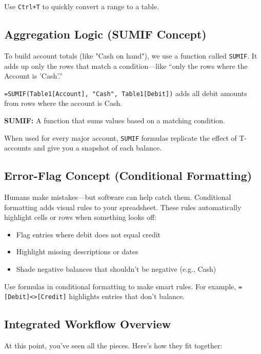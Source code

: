 \begin{Tip}
Use \texttt{Ctrl+T} to quickly convert a range to a table.
\end{Tip}

\subsection{Aggregation Logic (SUMIF Concept)}
To build account totals (like "Cash on hand"), we use a function called \texttt{SUMIF}. It adds up only the rows that match a condition—like “only the rows where the Account is 'Cash'.”

\begin{Example}
\verb|=SUMIF(Table1[Account], "Cash", Table1[Debit])| adds all debit amounts from rows where the account is Cash.
\end{Example}

\begin{Definition}
\textbf{SUMIF:} A function that sums values based on a matching condition.
\end{Definition}

When used for every major account, \texttt{SUMIF} formulas replicate the effect of T-accounts and give you a snapshot of each balance.

\subsection{Error-Flag Concept (Conditional Formatting)}
Humans make mistakes—but software can help catch them. Conditional formatting adds visual rules to your spreadsheet. These rules automatically highlight cells or rows when something looks off:

\begin{itemize}
\item Flag entries where debit does not equal credit
\item Highlight missing descriptions or dates
\item Shade negative balances that shouldn’t be negative (e.g., Cash)
\end{itemize}

\begin{Tip}
Use formulas in conditional formatting to make smart rules. For example, \verb|=[Debit]<>[Credit]| highlights entries that don’t balance.
\end{Tip}

\subsection{Integrated Workflow Overview}
At this point, you’ve seen all the pieces. Here’s how they fit together:

